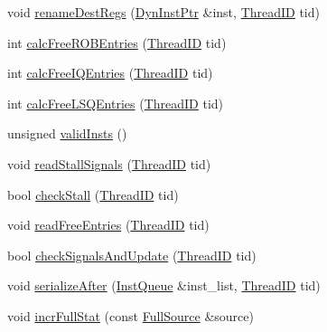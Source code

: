 \begin{DoxyCompactItemize}
\item 
void \hyperlink{classDefaultRename_a21ced1baf75f43ecfa99d8c90ae210d6}{renameDestRegs} (\hyperlink{classDefaultRename_a028ce10889c5f6450239d9e9a7347976}{DynInstPtr} \&inst, \hyperlink{base_2types_8hh_ab39b1a4f9dad884694c7a74ed69e6a6b}{ThreadID} tid)
\item 
int \hyperlink{classDefaultRename_a6367314e59f9295e1bf57419938874c5}{calcFreeROBEntries} (\hyperlink{base_2types_8hh_ab39b1a4f9dad884694c7a74ed69e6a6b}{ThreadID} tid)
\item 
int \hyperlink{classDefaultRename_a27fa95f1f1dd353635a73f0b56a64e24}{calcFreeIQEntries} (\hyperlink{base_2types_8hh_ab39b1a4f9dad884694c7a74ed69e6a6b}{ThreadID} tid)
\item 
int \hyperlink{classDefaultRename_a31f50b46622924ea0e53e641b635887c}{calcFreeLSQEntries} (\hyperlink{base_2types_8hh_ab39b1a4f9dad884694c7a74ed69e6a6b}{ThreadID} tid)
\item 
unsigned \hyperlink{classDefaultRename_ad533c56329b83d5b1aef92d0a6594b2c}{validInsts} ()
\item 
void \hyperlink{classDefaultRename_ad65c9f053a6038ac8c34c34bfe9a88c3}{readStallSignals} (\hyperlink{base_2types_8hh_ab39b1a4f9dad884694c7a74ed69e6a6b}{ThreadID} tid)
\item 
bool \hyperlink{classDefaultRename_a2dd2400250619a315cb46f95f777db01}{checkStall} (\hyperlink{base_2types_8hh_ab39b1a4f9dad884694c7a74ed69e6a6b}{ThreadID} tid)
\item 
void \hyperlink{classDefaultRename_a7dc4c8fb34921e56b869bac55a7f3806}{readFreeEntries} (\hyperlink{base_2types_8hh_ab39b1a4f9dad884694c7a74ed69e6a6b}{ThreadID} tid)
\item 
bool \hyperlink{classDefaultRename_af77f2bf38a75182c65e633b9fdf295d2}{checkSignalsAndUpdate} (\hyperlink{base_2types_8hh_ab39b1a4f9dad884694c7a74ed69e6a6b}{ThreadID} tid)
\item 
void \hyperlink{classDefaultRename_a4010b268c107b9aa7289a98f67171e08}{serializeAfter} (\hyperlink{classstd_1_1list}{InstQueue} \&inst\_\-list, \hyperlink{base_2types_8hh_ab39b1a4f9dad884694c7a74ed69e6a6b}{ThreadID} tid)
\item 
void \hyperlink{classDefaultRename_a11c6015950a669c6a37e5d9bee62bbbf}{incrFullStat} (const \hyperlink{classDefaultRename_ae3b7ca6b65ac494b86816b5f1dd24e96}{FullSource} \&source)
\end{DoxyCompactItemize}
